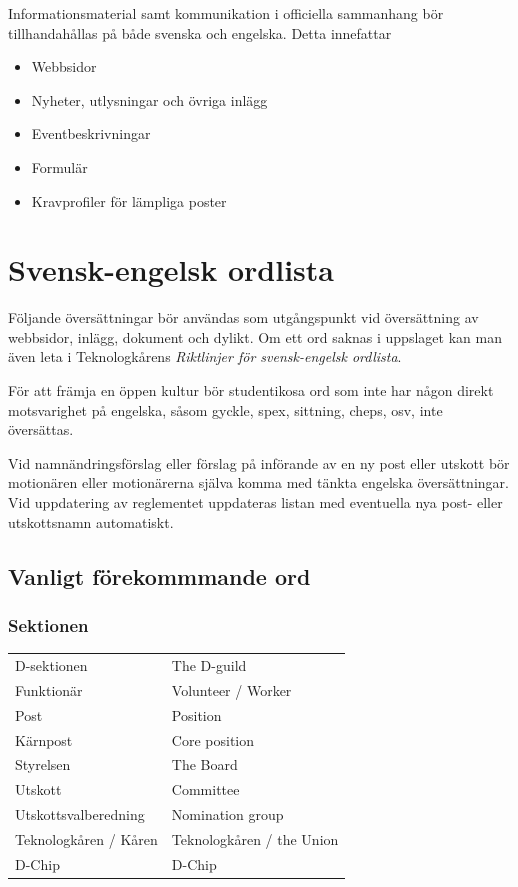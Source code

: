 \documentclass{dsekprotokoll}
\begin{document}
Informationsmaterial samt kommunikation i officiella sammanhang bör tillhandahållas på både svenska och engelska. Detta innefattar

\begin{itemize}
    \item Webbsidor
    \item Nyheter, utlysningar och övriga inlägg
    \item Eventbeskrivningar
    \item Formulär
    \item Kravprofiler för lämpliga poster%
\end{itemize}


\section{Svensk-engelsk ordlista}

Följande översättningar bör användas som utgångspunkt vid översättning av webbsidor, inlägg, dokument och dylikt. Om ett ord saknas i uppslaget kan man även leta i Teknologkårens \textit{Riktlinjer för svensk-engelsk ordlista}. 

För att främja en öppen kultur bör studentikosa ord som inte har någon direkt motsvarighet på engelska, såsom gyckle, spex, sittning, cheps, osv, inte översättas. 

Vid namnändringsförslag eller förslag på införande av en ny post eller utskott bör motionären eller motionärerna själva komma med tänkta engelska översättningar. Vid uppdatering av reglementet uppdateras listan med eventuella nya post- eller utskottsnamn automatiskt. 

\subsection{Vanligt förekommmande ord}
\subsubsection*{Sektionen}
\begin{center}
    \begin{tabular}{R{6.5cm}|L{6.5cm}}
        D-sektionen & The D-guild\\
        Funktionär & Volunteer / Worker\\
        Post & Position\\
        Kärnpost & Core position\\
        Styrelsen & The Board\\
        Utskott & Committee\\
        Utskottsvalberedning & Nomination group\\
        Teknologkåren / Kåren & Teknologkåren / the Union\\
        D-Chip & D-Chip\\
    \end{tabular}
\end{center}
\end{document}
